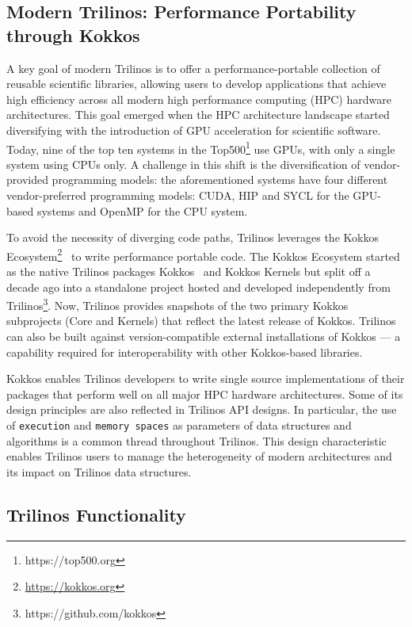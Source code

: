 \subsection{Modern Trilinos:  Performance Portability through Kokkos}


A key goal of modern Trilinos is to offer a performance-portable collection of reusable scientific libraries, allowing users to develop applications that achieve high efficiency across all modern high performance computing (HPC) hardware architectures.
This goal emerged when the HPC architecture landscape started diversifying with the
introduction of GPU acceleration for scientific software. Today, nine of the top ten systems in the Top500\footnote{https://top500.org} use GPUs, with only a single system using CPUs only. A challenge in this shift is the diversification of vendor-provided programming models: the aforementioned systems have four different vendor-preferred programming models: CUDA, HIP and SYCL for the GPU-based systems and OpenMP for the CPU system.

To avoid the necessity of diverging code paths, Trilinos leverages the Kokkos Ecosystem\footnote{\url{https://kokkos.org}}~\cite{trott2021kokkos} to write performance portable code. The Kokkos Ecosystem started as the native Trilinos packages Kokkos~\cite{heroux2011toward} and Kokkos Kernels but split off a decade ago into a standalone project hosted and developed independently from Trilinos\footnote{https://github.com/kokkos}.
Now, Trilinos provides snapshots of the two primary Kokkos subprojects (Core and Kernels) that reflect the latest release of Kokkos. Trilinos can also be built against version-compatible external installations of Kokkos --- a capability required for interoperability with other Kokkos-based libraries.

Kokkos enables Trilinos developers to write single source implementations of their packages that perform well on all major HPC hardware architectures. Some of its design principles are also reflected in Trilinos API designs. In particular, the
use of \texttt{execution} and \texttt{memory spaces} as parameters of data structures and algorithms is a common thread throughout Trilinos. This design characteristic enables Trilinos users to manage the heterogeneity of modern architectures and its impact on Trilinos data structures.


\subsection{Trilinos Functionality}

